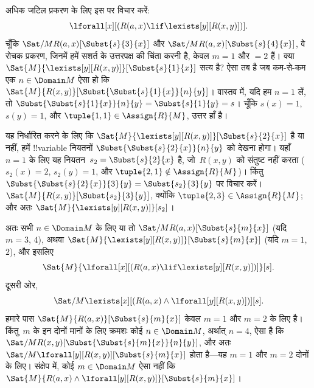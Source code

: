 \documentclass[../../../include/open-logic-section]{subfiles}
\begin{document}
\begin{ex}

अधिक जटिल प्रकरण के लिए इस पर विचार करें:
\[
\lforall[x][(R(a,x) \lif \lexists[y][R(x,y)])].
\]
चूँकि $\Sat/{M}{R(a,x)}[\Subst{s}{3}{x}]$ और
$\Sat/{M}{R(a,x)}[\Subst{s}{4}{x}]$, वे रोचक प्रकरण, जिनमें हमें सशर्त
के उत्तरपक्ष की चिंता करनी है, केवल $m = 1$ और $ = 2$ हैं। क्या
$\Sat{M}{\lexists[y][R(x,y)]}[\Subst{s}{1}{x}]$ सत्य है? ऐसा तब है जब
कम-से-कम एक $n \in \Domain M$ ऐसा हो कि
$\Sat{M}{R(x,y)}[\Subst{\Subst{s}{1}{x}}{n}{y}]$। वास्तव में, यदि हम
$n = 1$ लें, तो $\Subst{\Subst{s}{1}{x}}{n}{y} = \Subst{s}{1}{y} =
s$।
चूँकि $s(x) = 1$, $s(y) = 1$, और $\tuple{1,1} \in \Assign{R}{M}$, उत्तर
हाँ है।

यह निर्धारित करने के लिए कि
$\Sat{M}{\lexists[y][R(x,y)]}[\Subst{s}{2}{x}]$ है या नहीं, हमें
!!{variable} नियतनों $\Subst{\Subst{s}{2}{x}}{n}{y}$ को देखना होगा। यहाँ
$n = 1$ के लिए यह नियतन~$s_2 = \Subst{s}{2}{x}$ है, जो~$R(x,y)$ को
संतुष्ट नहीं करता ($s_2(x) =
2$, $s_2(y) = 1$, और
$\tuple{2,1}\notin \Assign{R}{M}$)। किंतु
$\Subst{\Subst{s}{2}{x}}{3}{y} = \Subst{s_2}{3}{y}$ पर विचार करें।
$\Sat{M}{R(x,y)}[\Subst{s_2}{3}{y}]$, क्योंकि $\tuple{2,3} \in
\Assign{R}{M}$; और अतः
$\Sat{M}{\lexists[y][R(x,y)]}[s_2]$।

अतः सभी $n \in \Domain M$ के लिए या तो
$\Sat/{M}{R(a,x)}[\Subst{s}{m}{x}]$ (यदि $m = 3$, $4$), अथवा
$\Sat{M}{\lexists[y][R(x,y)]}[\Subst{s}{m}{x}]$ (यदि $m = 1$, $2$), और इसलिए
\[
\Sat{M}{\lforall[x][(R(a,x) \lif \lexists[y][R(x,y)])]}[s].
\]
दूसरी ओर,
\[
\Sat/{M}{\lexists[x][(R(a,x) \land \lforall[y][R(x,y)])]}[s].
\]
हमारे पास $\Sat{M}{R(a,x)}[\Subst{s}{m}{x}]$ केवल $m = 1$ और $m =
2$
के लिए है। किंतु~$m$ के इन दोनों मानों के लिए क्रमशः कोई
$n \in
\Domain M$, अर्थात् $n = 4$, ऐसा है कि
$\Sat/{M}{R(x,y)}[\Subst{\Subst{s}{m}{x}}{n}{y}]$, और अतः
$\Sat/{M}{\lforall[y][R(x,y)]}[\Subst{s}{m}{x}]$ होता है—यह $m = 1$ और $m =
2$ दोनों के लिए। संक्षेप
में, कोई $m \in \Domain M$ ऐसा नहीं कि $\Sat{M}{R(a,x)
\land \lforall[y][R(x,y)]}[\Subst{s}{m}{x}]$।
\end{ex}
\end{document}
